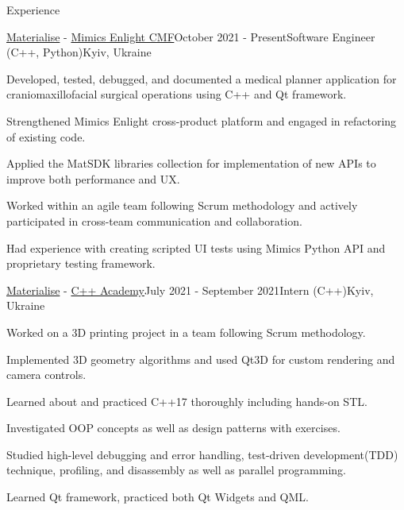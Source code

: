 \documentclass[
	11pt, %
]{resume} %
\begin{document}

\begin{rSection}{Experience}

	\begin{rSubsection}{\href{https://www.materialise.com/en}{\color{blue}Materialise} - \href{https://www.materialise.com/ja/healthcare/mimics-enlight-cmf}{\color{blue}Mimics Enlight CMF}}{October 2021 - Present}{Software Engineer (C++, Python)}{Kyiv, Ukraine}
        \item Developed, tested, debugged, and documented a medical planner application for craniomaxillofacial surgical operations using C++ and Qt framework.
        \item Strengthened Mimics Enlight cross-product platform and engaged in refactoring of existing code.
		\item Applied the MatSDK libraries collection for implementation of new APIs to improve both performance and UX.
        \item Worked within an agile team following Scrum methodology and actively participated in cross-team communication and collaboration.
        \item Had experience with creating scripted UI tests using Mimics Python API and proprietary testing framework.
	\end{rSubsection}


    \begin{rSubsection}{\href{https://www.materialise.com/en}{\color{blue}Materialise} - \href{https://www.materialise.com/en/careers/students-graduates/internships}{\color{blue}C++ Academy}}{July 2021 - September 2021}{Intern (C++)}{Kyiv, Ukraine}
        \item Worked on a 3D printing project in a team following Scrum methodology.
        \item Implemented 3D geometry algorithms and used Qt3D for custom rendering and camera controls.
        \item Learned about and practiced C++17 thoroughly including hands-on STL.
        \item Investigated OOP concepts as well as design patterns with exercises.
        \item Studied high-level debugging and error handling, test-driven development(TDD) technique, profiling, and disassembly as well as parallel programming.
        \item Learned Qt framework, practiced both Qt Widgets and QML.
    \end{rSubsection}

\end{rSection}
\end{document}
